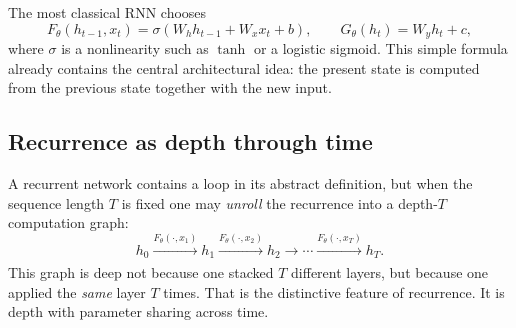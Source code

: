 \medskip

The most classical RNN chooses
\[
F_\theta(h_{t-1},x_t) = \sigma(W_h h_{t-1} + W_x x_t + b),
\qquad
G_\theta(h_t)=W_y h_t + c,
\]
where $\sigma$ is a nonlinearity such as $\tanh$ or a logistic sigmoid.
This simple formula already contains the central architectural idea:
the present state is computed from the previous state together with the new input.

\subsection*{Recurrence as depth through time}

A recurrent network contains a loop in its abstract definition, but when the sequence length $T$ is fixed one may \emph{unroll} the recurrence into a depth-$T$ computation graph:
\[
 h_0 \xrightarrow[]{F_\theta(\cdot,x_1)} h_1 \xrightarrow[]{F_\theta(\cdot,x_2)} h_2 \xrightarrow[]{} \cdots \xrightarrow[]{F_\theta(\cdot,x_T)} h_T.
\]
This graph is deep not because one stacked $T$ different layers, but because one applied the \emph{same} layer $T$ times.
That is the distinctive feature of recurrence.
It is depth with parameter sharing across time.

